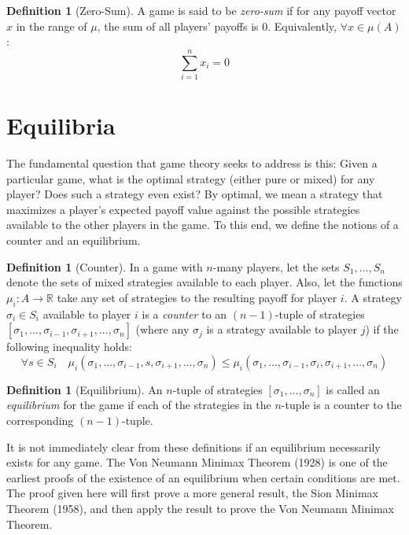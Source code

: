 \documentclass[12pt]{article}
\theoremstyle{definition}
\newtheorem{definition}[theorem]{Definition}
\theoremstyle{remark}
\begin{document}
\begin{definition}[Zero-Sum]
A game is said to be \emph{zero-sum} if for any payoff vector $x$ in the range of $\mu$, the sum of all players' payoffs is 0. Equivalently, $\forall x \in \mu(A)$:
\[
\sum_{i=1}^n x_i = 0
\]
\end{definition}



\section{Equilibria}

The fundamental question that game theory seeks to address is this: Given a particular game, what is the optimal strategy (either pure or mixed) for any player? Does such a strategy even exist? By optimal, we mean a strategy that maximizes a player's expected payoff value against the possible strategies available
to the other players in the game. To this end, we define the notions of a counter and an equilibrium.

\begin{definition}[Counter]
In a game with $n$-many players, let the sets $S_1 , ... , S_n$ denote the sets of mixed strategies available to each player. Also, let the functions $\mu_i: A \rightarrow \mathbb{R}$ take any set of strategies to the resulting payoff for player $i$.
A strategy $\sigma_i \in S_i$ available to player $i$ is a \emph{counter} to an $(n-1)$-tuple of strategies $[\sigma_1 , ... , \sigma_{i-1} , \sigma_{i+1} , ... , \sigma_n]$ (where any $\sigma_j$ is a strategy available to player $j$) if the following inequality holds:
\[
\forall s \in S_i \quad \mu_i(\sigma_1 , ... , \sigma_{i-1} , s , \sigma_{i+1} , ... , \sigma_n) \leq \mu_i(\sigma_1 , ... , \sigma_{i-1} , \sigma_i , \sigma_{i+1} , ... , \sigma_n)
\]
\end{definition}

\begin{definition}[Equilibrium]
An $n$-tuple of strategies $[\sigma_1 , ... , \sigma_n]$ is called an \emph{equilibrium} for the game if each of the strategies in the $n$-tuple is a counter to the corresponding $(n-1)$-tuple.
\end{definition}

It is not immediately clear from these definitions if an equilibrium necessarily exists for any game. The Von Neumann Minimax Theorem (1928) is one of the earliest proofs of the existence of an equilibrium when certain conditions are met. The proof given here will first prove a more general result,
the Sion Minimax Theorem (1958), and then apply the result to prove the Von Neumann Minimax Theorem.
\end{document}
